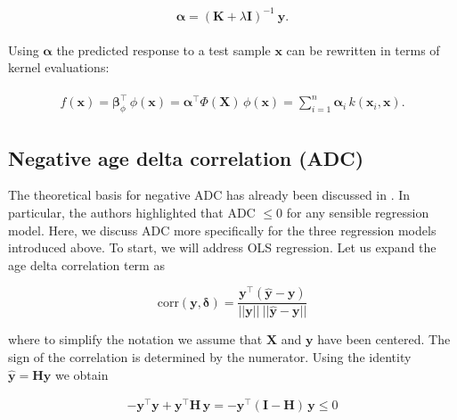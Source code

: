 \documentclass[utf8]{frontiersSCNS} %
\newcommand{\al}{\boldsymbol{\alpha}}
\renewcommand{\b}{\boldsymbol{\beta}} %
\newcommand{\corr}{\text{corr}}
\renewcommand{\d}{\boldsymbol{\delta}}
\renewcommand{\H}{\mathbf{H}}
\newcommand{\I}{\mathbf{I}}
\newcommand{\K}{\mathbf{K}}
\newcommand{\x}{\mathbf{x}}
\newcommand{\X}{\mathbf{X}}
\newcommand{\y}{\mathbf{y}}
\newcommand{\yh}{\mathbf{\hat{y}}}
\begin{document}
\begin{align}
\begin{split}
\label{eq:kernel_ridge}
\al = (\K + \lambda\I)^{-1}\ \y.
\end{split}
\end{align}

Using $\al$ the predicted response to a test sample $\x$ can be rewritten in terms of kernel evaluations:

\begin{align}
\begin{split}
\label{eq:kernel_ridge_apply}
f(\x) = \b_\phi^\top\, \phi(\x) = \al^\top\Phi(\X)\,\phi(\x) = \sum_{i=1}^n \al_i\, k(\x_i, \x).
\end{split}
\end{align}


\subsection{Negative age delta correlation (ADC)}\label{sec:ADC}

The theoretical basis for negative ADC has already been discussed in \cite{Le2018ABrainAGE}. In particular, the authors highlighted that ADC $\le 0$ for any sensible regression model. Here, we discuss ADC more specifically for the three regression models introduced above. To start, we will address OLS regression. Let us expand the age delta correlation term as

\begin{equation}\label{eq:correlation}
\corr(\y,\d) = \frac{\y^\top(\yh-\y)}{||\y||\ ||\yh-\y||} 
\end{equation}

where to simplify the notation we assume that $\X$ and $\y$ have been centered. The sign of the correlation is determined by the numerator. Using the identity $\yh = \H\y$ we obtain

\begin{equation}\label{eq:tmp}
\begin{split}
- \y^\top\y + \y^\top\H\,\y = -  \y^\top(\I-\H)\,\y\le 0
\end{split}
\end{equation}
\end{document}

